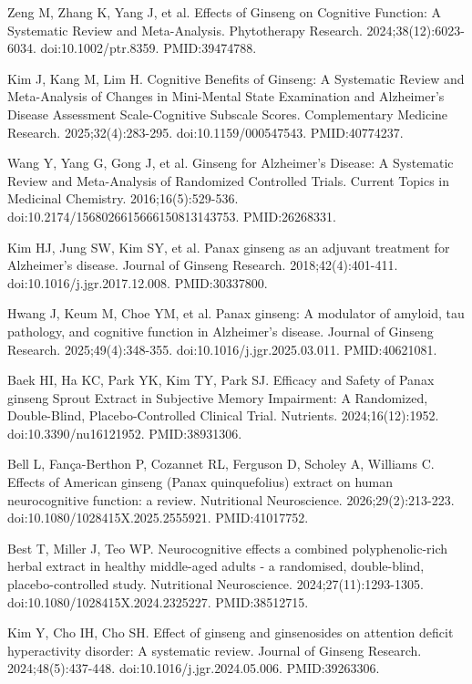\documentclass[12pt,oneside]{book}
\newcommand{\reff}[2]{\par\hangindent=7mm\hangafter=1\noindent[#1]\hspace{2mm}#2\par}
\begin{document}
\reff{43}{Zeng M, Zhang K, Yang J, et al. Effects of Ginseng on Cognitive Function: A Systematic Review and Meta-Analysis. Phytotherapy Research. 2024;38(12):6023-6034. doi:10.1002/ptr.8359. PMID:39474788.}

\reff{44}{Kim J, Kang M, Lim H. Cognitive Benefits of Ginseng: A Systematic Review and Meta-Analysis of Changes in Mini-Mental State Examination and Alzheimer's Disease Assessment Scale-Cognitive Subscale Scores. Complementary Medicine Research. 2025;32(4):283-295. doi:10.1159/000547543. PMID:40774237.}

\reff{45}{Wang Y, Yang G, Gong J, et al. Ginseng for Alzheimer's Disease: A Systematic Review and Meta-Analysis of Randomized Controlled Trials. Current Topics in Medicinal Chemistry. 2016;16(5):529-536. doi:10.2174/1568026615666150813143753. PMID:26268331.}

\reff{46}{Kim HJ, Jung SW, Kim SY, et al. Panax ginseng as an adjuvant treatment for Alzheimer's disease. Journal of Ginseng Research. 2018;42(4):401-411. doi:10.1016/j.jgr.2017.12.008. PMID:30337800.}

\reff{47}{Hwang J, Keum M, Choe YM, et al. Panax ginseng: A modulator of amyloid, tau pathology, and cognitive function in Alzheimer's disease. Journal of Ginseng Research. 2025;49(4):348-355. doi:10.1016/j.jgr.2025.03.011. PMID:40621081.}

\reff{48}{Baek HI, Ha KC, Park YK, Kim TY, Park SJ. Efficacy and Safety of Panax ginseng Sprout Extract in Subjective Memory Impairment: A Randomized, Double-Blind, Placebo-Controlled Clinical Trial. Nutrients. 2024;16(12):1952. doi:10.3390/nu16121952. PMID:38931306.}

\reff{49}{Bell L, Fança-Berthon P, Cozannet RL, Ferguson D, Scholey A, Williams C. Effects of American ginseng (Panax quinquefolius) extract on human neurocognitive function: a review. Nutritional Neuroscience. 2026;29(2):213-223. doi:10.1080/1028415X.2025.2555921. PMID:41017752.}

\reff{50}{Best T, Miller J, Teo WP. Neurocognitive effects a combined polyphenolic-rich herbal extract in healthy middle-aged adults - a randomised, double-blind, placebo-controlled study. Nutritional Neuroscience. 2024;27(11):1293-1305. doi:10.1080/1028415X.2024.2325227. PMID:38512715.}

\reff{51}{Kim Y, Cho IH, Cho SH. Effect of ginseng and ginsenosides on attention deficit hyperactivity disorder: A systematic review. Journal of Ginseng Research. 2024;48(5):437-448. doi:10.1016/j.jgr.2024.05.006. PMID:39263306.}
\end{document}
